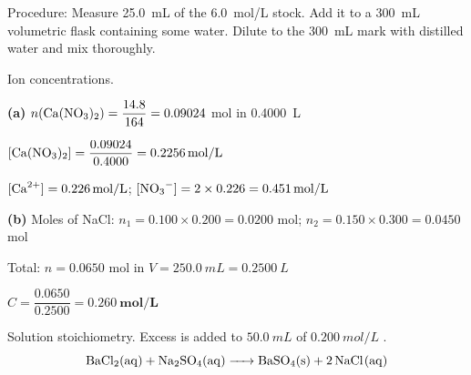 \documentclass[addpoints]{exam}
\begin{document}
\begin{questions}
\begin{solution}[9cm]
Procedure: Measure \SI{25.0}{mL} of the \SI{6.0}{mol/L}  stock. Add it to a
\SI{300}{mL} volumetric flask containing some water. Dilute to the \SI{300}{mL} mark
with distilled water and mix thoroughly.
\end{solution}

\question Ion concentrations.
\begin{solution}[9cm]
\textbf{(a)} $n(\ce{Ca(NO3)2}) = \dfrac{14.8}{164} = 0.09024$ mol in \SI{0.4000}{L}

$[\ce{Ca(NO3)2}] = \dfrac{0.09024}{0.4000} = \SI{0.2256}{mol/L}$


$[\ce{Ca^{2+}}] = \mathbf{\SI{0.226}{mol/L}}$;\quad
$[\ce{NO3^-}] = 2 \times 0.226 = \mathbf{\SI{0.451}{mol/L}}$

\textbf{(b)} Moles of NaCl: $n_1 = 0.100 \times 0.200 = 0.0200$ mol;\;
$n_2 = 0.150 \times 0.300 = 0.0450$ mol

Total: $n = 0.0650$ mol in $V = \SI{250.0}{mL} = \SI{0.2500}{L}$

$C = \dfrac{0.0650}{0.2500} = \mathbf{\SI{0.260}{mol/L}}$
\end{solution}

\question Solution stoichiometry. Excess  is added to $\SI{50.0}{mL}$
of $\SI{0.200}{mol/L}$ .
\[\ce{BaCl2(aq) + Na2SO4(aq) -> BaSO4(s) + 2NaCl(aq)}\]
\end{questions}
\end{document}
